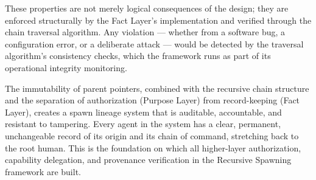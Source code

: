 These properties are not merely logical consequences of the design; they are enforced structurally by the Fact Layer's implementation and verified through the chain traversal algorithm. Any violation — whether from a software bug, a configuration error, or a deliberate attack — would be detected by the traversal algorithm's consistency checks, which the framework runs as part of its operational integrity monitoring.

The immutability of parent pointers, combined with the recursive chain structure and the separation of authorization (Purpose Layer) from record-keeping (Fact Layer), creates a spawn lineage system that is auditable, accountable, and resistant to tampering. Every agent in the system has a clear, permanent, unchangeable record of its origin and its chain of command, stretching back to the root human. This is the foundation on which all higher-layer authorization, capability delegation, and provenance verification in the Recursive Spawning framework are built.